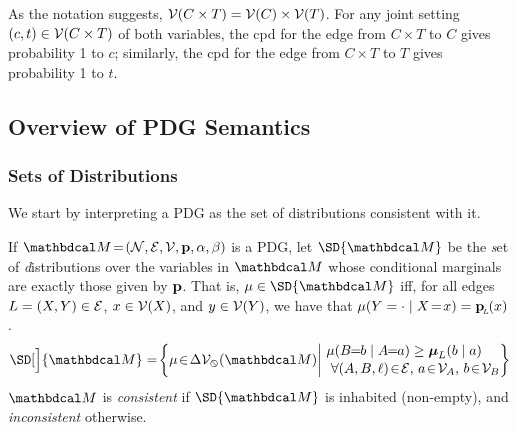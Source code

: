 \documentclass[the-pdg-manual.tex]{subfiles}
\begin{document}
\begin{constr}
As the notation suggests, $\mathcal V( C \times T) = \mathcal V(C) \times \mathcal V(T)$.
For any joint setting $(c,t) \in \mathcal V(C \times T)$ of both variables, the cpd for
the edge from $C \times T$ to $C$ gives probability 1 to $c$;
similarly, the cpd for the edge from $ C \times T$ to $T$ gives probability 1 to $t$.
\end{constr}


	\subsection{Overview of PDG Semantics}
	\subsubsection{Sets of Distributions}
	We start by interpreting a PDG as the set of distributions consistent with it.  
	\begin{defn} \label{def:set-semantics} 
		If $\dg M\!=\!\pdgvars[]$ is a PDG, let $\SD{\dg M}$ be the \emph{s}et of \emph{d}istributions over the variables in $\dg M$ whose conditional marginals are exactly those given by $\mathbf p$.
		That is, $\mu \in \SD{\dg M}$ iff, for all edges $L = (X,Y) \in \mathcal E$,  $x \in \mathcal V(X)$,  and $y \in \mathcal V(Y)$, we have that $\mu(Y = \cdot \mid X\!=\! x) = \mathbf{p}_{\!_{L}\!}(x)$.
		{
			\[ \SD[\Big]{\dg M} = \!\left\{\mu \!\in\! \Delta \V_\none (\dg M) \middle|\!
			\begin{array}{l}
				\mu(B\!\! =\!\!b \mid A\!\!=\!\!a) \geq \boldsymbol\mu_L(b \mid a) \\[0.1em]
				~\text{$\forall (A, B,\ell) \!\in\! \Ed$, $a \!\in\!\mathcal V_A$, $b \!\in\! \mathcal V_B$} \end{array}\!\!\! \right\}\]
		}
		$\dg M$ is \emph{consistent} if $\SD{\dg M}$ is inhabited (non-empty), and \emph{inconsistent} otherwise.
	\end{defn}
	
\end{document}
